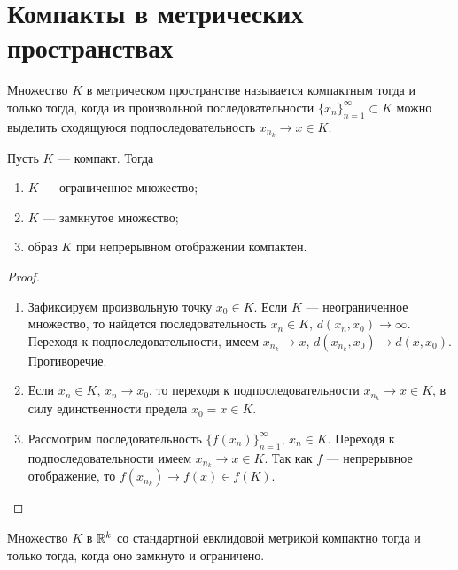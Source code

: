 \documentclass[a4paper]{article}
\theoremstyle{named}
\begin{document}
    \section{Компакты в метрических пространствах}

    \begin{definition*}
        Множество $K$ в метрическом пространстве называется компактным тогда и только тогда, когда из произвольной последовательности $\{x_n\}_{n = 1}^{\infty} \subset K$ можно выделить сходящуюся подпоследовательность $x_{n_k} \to x \in K$.
    \end{definition*}

    \begin{lemma*}
        Пусть $K$ --- компакт. Тогда
        \begin{enumerate}
        \item
            $K$ --- ограниченное множество;

        \item
            $K$ --- замкнутое множество;

        \item
            образ $K$ при непрерывном отображении компактен.
        \end{enumerate}
    \end{lemma*}

    \begin{proof}
        ~

        \begin{enumerate}
        \item
            Зафиксируем произвольную точку $x_0 \in K$. Если $K$ --- неограниченное множество, то найдется последовательность $x_n \in K$, $d(x_n, x_0) \to \infty$. Переходя к подпоследовательности, имеем $x_{n_k} \to x$, $d(x_{n_k}, x_0) \to d(x, x_0)$. Противоречие.

        \item
            Если $x_n \in K$, $x_n \to x_0$, то переходя к подпоследовательности $x_{n_k} \to x \in K$, в силу единственности предела $x_0 = x \in K$.

        \item
            Рассмотрим последовательность $\{f(x_n)\}_{n = 1}^{\infty}$, $x_n \in K$. Переходя к подпоследовательности имеем $x_{n_k} \to x \in K$. Так как $f$ --- непрерывное отображение, то $f(x_{n_k}) \to f(x) \in f(K)$.
        \end{enumerate}
    \end{proof}

    \begin{proposal*}
        Множество $K$ в $\mathbb{R}^k$ со стандартной евклидовой метрикой компактно тогда и только тогда, когда оно замкнуто и ограничено.
    \end{proposal*}
\end{document}
